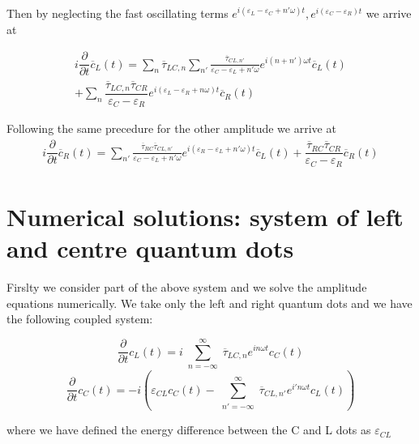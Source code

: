 Then by neglecting the fast oscillating terms $ e^{i ( \varepsilon_L - \varepsilon_C + n'\omega ) t } , e^{i ( \varepsilon_C - \varepsilon_R )  t } $ we arrive at

\begin{multline} \label{eq:2.9}
i\dfrac{\partial}{\partial t} \overline{c}_L (t)=  \sum_{n}  \overline{\tau}_{LC,n}  \sum_{n'} \frac{\overline{\tau}_{CL,n'} } { \varepsilon_C -\varepsilon_L + n' \omega } { e^{ i (n+n')\omega t } } \overline{c}_L(t) 
\\
+ \sum_{n} \dfrac{  \overline{\tau}_{LC,n}  \overline{\tau}_{CR}}{ { \varepsilon_C - \varepsilon_R }  } e^{i ( \varepsilon_L - \varepsilon_R + n \omega )  t } \overline{c}_R(t) 
\end{multline}

Following the same precedure for the other amplitude we arrive at 
\begin{multline} \label{eq:2.10}
i\dfrac{\partial}{\partial t} \overline{c}_R (t)=  \sum_{n'}
\frac{ \overline{\tau}_{RC} \overline{\tau}_{CL,n'}  } { \varepsilon_C -\varepsilon_L + n' \omega } e^{i ( \varepsilon_R - \varepsilon_L + n' \omega )  t }   \overline{c}_L(t) 
+  \dfrac{  \overline{\tau}_{RC}  \overline{\tau}_{CR}}{ { \varepsilon_C - \varepsilon_R }  }  \overline{c}_R(t) 
\end{multline}

\section{Numerical solutions: system of left and centre quantum dots}



Firslty we consider part of the above system and we solve the amplitude equations numerically. We take only the left and right quantum dots and we have the following coupled system:

\begin{equation} \label{eq:2.11}
\dfrac{\partial}{\partial t} c_L (t) = i \sum_{\substack{n=-\infty}}^{\infty} \overline{\tau}_{LC,n} e^{in\omega t } c_C (t) 
\end{equation}
\begin{equation} \label{eq:2.12}
\dfrac{\partial}{\partial t} c_C (t) = -i \left( \varepsilon_{CL} c_C(t) -  \sum_{\substack{n'=-\infty}}^{\infty} \overline{\tau}_{CL,n'} e^{i'n\omega t } c_L (t) \right)
\end{equation}

where we have defined the energy difference between the C and L dots as $\varepsilon_{CL}$

